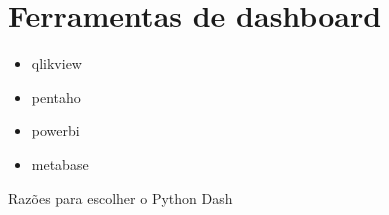 \chapter{Ferramentas de dashboard}\label{cap_trabalho_academico}

\begin{itemize}
	\item qlikview
	
	\item pentaho
	
	\item powerbi
	
	\item metabase
\end{itemize}

Razões para escolher o Python Dash
